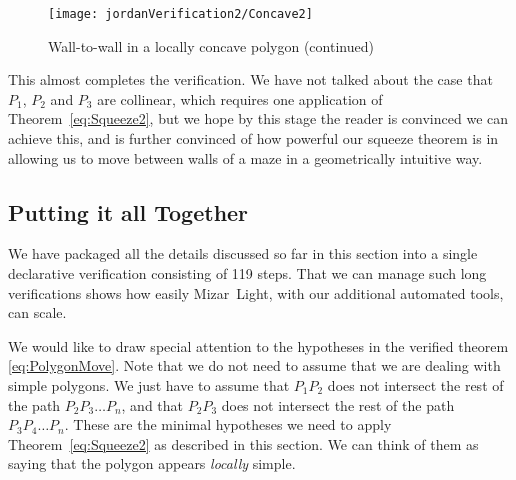 \begin{figure}
\centering\texttt{[image: jordanVerification2/Concave2]}
\caption{Wall-to-wall in a locally concave polygon (continued)}
\label{fig:Concave2}
\end{figure}

This almost completes the verification. We have not talked about the case that $P_1$, $P_2$ and $P_3$ are collinear, which requires one application of Theorem~\ref{eq:Squeeze2}, but we hope by this stage the reader is convinced we can achieve this, and is further convinced of how powerful our squeeze theorem is in allowing us to move between walls of a maze in a geometrically intuitive way.

\subsection{Putting it all Together}
We have packaged all the details discussed so far in this section into a single declarative verification consisting of 119 steps. That we can manage such long verifications shows how easily Mizar~Light, with our additional automated tools, can scale.

We would like to draw special attention to the hypotheses in the verified theorem \eqref{eq:PolygonMove}. Note that we do not need to assume that we are dealing with simple polygons. We just have to assume that $P_1P_2$ does not intersect the rest of the path $P_2P_3\ldots P_n$, and that $P_2P_3$ does not intersect the rest of the path $P_3P_4\ldots P_n$. These are the minimal hypotheses we need to apply Theorem~\ref{eq:Squeeze2} as described in this section. We can think of them as saying that the polygon appears \emph{locally} simple.

